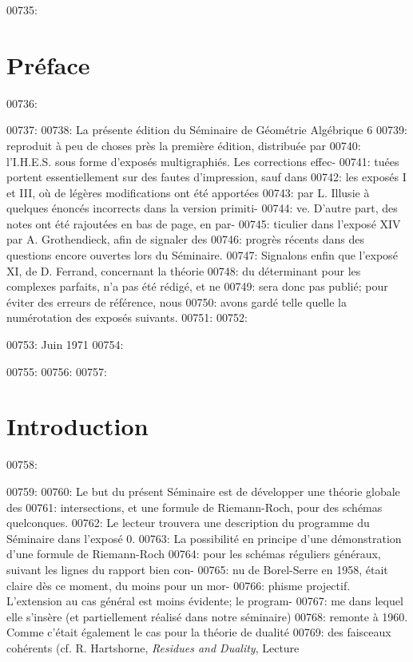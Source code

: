 00735: \section*{Pr\'eface}
00736: 
00737: 
00738: La pr\'esente \'edition du S\'eminaire de G\'eom\'etrie Alg\'ebrique 6
00739: reproduit \`a peu de choses pr\`es la premi\`ere \'edition, distribu\'ee par
00740: l'I.H.E.S. sous forme d'expos\'es multigraphi\'es. Les corrections effec-
00741: tu\'ees portent essentiellement sur des fautes d'impression, sauf dans
00742: les expos\'es I et III, o\`u de l\'eg\`eres modifications ont \'et\'e apport\'ees
00743: par L. Illusie \`a quelques \'enonc\'es incorrects dans la version primiti-
00744: ve. D'autre part, des notes ont \'et\'e rajout\'ees en bas de page, en par-
00745: ticulier dans l'expos\'e XIV par A. Grothendieck, afin de signaler des
00746: progr\`es r\'ecents dans des questions encore ouvertes lors du S\'eminaire.
00747: Signalons enfin que l'expos\'e XI, de D. Ferrand, concernant la th\'eorie
00748: du d\'eterminant pour les complexes parfaits, n'a pas \'et\'e r\'edig\'e, et ne
00749: sera donc pas publi\'e; pour \'eviter des erreurs de r\'ef\'erence, nous
00750: avons gard\'e telle quelle la num\'erotation des expos\'es suivants.
00751: 
00752: \begin{flushright}
00753: Juin 1971
00754: \end{flushright}
00755: 
00756: 
00757: \section*{Introduction}
00758: 
00759: 
00760: Le but du pr\'esent S\'eminaire est de d\'evelopper une th\'eorie globale des
00761: intersections, et une formule de Riemann-Roch, pour des sch\'emas quelconques.
00762: Le lecteur trouvera une description du programme du S\'eminaire dans l'expos\'e 0.
00763: La possibilit\'e en principe d'une d\'emonstration d'une formule de Riemann-Roch
00764: pour les sch\'emas r\'eguliers g\'en\'eraux, suivant les lignes du rapport bien con-
00765: nu de Borel-Serre en 1958, \'etait claire d\`es ce moment, du moins pour un mor-
00766: phisme projectif. L'extension au cas g\'en\'eral est moins \'evidente; le program-
00767: me dans lequel elle s'ins\`ere (et partiellement r\'ealis\'e dans notre s\'eminaire)
00768: remonte \`a 1960. Comme c'\'etait \'egalement le cas pour la th\'eorie de dualit\'e
00769: des faisceaux coh\'erents (cf. R. Hartshorne, \textit{Residues and Duality}, Lecture
